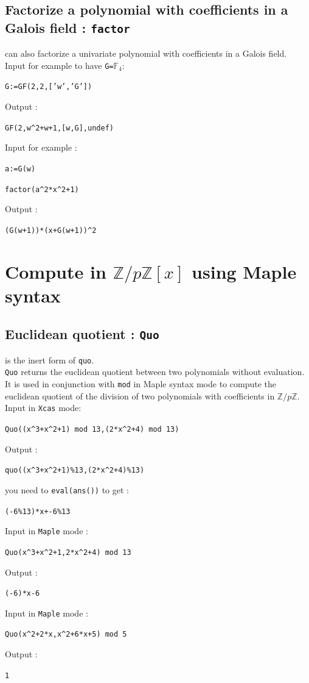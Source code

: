 \documentclass[a4paper,11pt]{book}
\newcommand{\Z}{{\mathbb{Z}}}
\begin{document}
\subsection{Factorize a polynomial with coefficients in a Galois field : {\tt factor}}
 can also factorize a univariate
polynomial with coefficients in a Galois field.\\
Input for example to have {\tt G=}$\mathbb F_4$:\\
\begin{center}{\tt G:=GF(2,2,['w','G'])}\end{center}
Output :
\begin{center}{\tt GF(2,w\verb|^|2+w+1,[w,G],undef)}\end{center}
Input for example :
\begin{center}{\tt a:=G(w)}\end{center}
\begin{center}{\tt factor(a\verb|^|2*x\verb|^|2+1)}\end{center}
Output :
\begin{center}{\tt (G(w+1))*(x+G(w+1))\verb|^|2}\end{center}

\section{Compute in $\Z/p\Z[x]$ using Maple syntax}\index{\%}\label{sec:modulmap}
\subsection{Euclidean quotient : {\tt Quo}}
 is the inert form of {\tt quo}.\\
{\tt Quo} returns the euclidean quotient between two polynomials
 without evaluation.\\ 
It is used in conjunction with {\tt mod} in Maple syntax mode to compute
the euclidean quotient of the division of two
polynomials with coefficients in $\Z/p\Z$.\\
Input in {\tt Xcas} mode:
\begin{center}{\tt Quo((x\verb|^|3+x\verb|^|2+1) mod 13,(2*x\verb|^|2+4) mod 13)}\end{center}
Output :
\begin{center}{\tt quo((x\verb|^|3+x\verb|^|2+1)\%13,(2*x\verb|^|2+4)\%13)}\end{center}
you need to {\tt eval(ans())} to get :
\begin{center}{\tt (-6\%13)*x+-6\%13}\end{center}
Input in {\tt Maple} mode :
\begin{center}{\tt Quo(x\verb|^|3+x\verb|^|2+1,2*x\verb|^|2+4) mod 13}\end{center}
Output :
\begin{center}{\tt (-6)*x-6}\end{center}
Input in {\tt Maple} mode :
\begin{center}{\tt Quo(x\verb|^|2+2*x,x\verb|^|2+6*x+5) mod 5}\end{center}
Output :
\begin{center}{\tt 1}\end{center}
\end{document}

